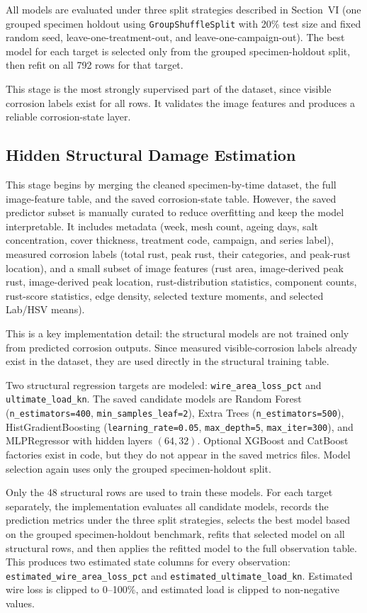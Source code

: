 \documentclass[conference]{IEEEtran}
\begin{document}
All models are evaluated under three split strategies described in Section~VI (one grouped specimen holdout using \texttt{GroupShuffleSplit} with 20\% test size and fixed random seed, leave-one-treatment-out, and leave-one-campaign-out). The best model for each target is selected only from the grouped specimen-holdout split, then refit on all 792 rows for that target.

This stage is the most strongly supervised part of the dataset, since visible corrosion labels exist for all rows. It validates the image features and produces a reliable corrosion-state layer.

\subsection{Hidden Structural Damage Estimation}
This stage begins by merging the cleaned specimen-by-time dataset, the full image-feature table, and the saved corrosion-state table. However, the saved predictor subset is manually curated to reduce overfitting and keep the model interpretable. It includes metadata (week, mesh count, ageing days, salt concentration, cover thickness, treatment code, campaign, and series label), measured corrosion labels (total rust, peak rust, their categories, and peak-rust location), and a small subset of image features (rust area, image-derived peak rust, image-derived peak location, rust-distribution statistics, component counts, rust-score statistics, edge density, selected texture moments, and selected Lab/HSV means).

This is a key implementation detail: the structural models are not trained only from predicted corrosion outputs. Since measured visible-corrosion labels already exist in the dataset, they are used directly in the structural training table.

Two structural regression targets are modeled: \texttt{wire\_area\_loss\_pct} and \texttt{ultimate\_load\_kn}. The saved candidate models are Random Forest (\texttt{n\_estimators=400}, \texttt{min\_samples\_leaf=2}), Extra Trees (\texttt{n\_estimators=500}), HistGradientBoosting (\texttt{learning\_rate=0.05}, \texttt{max\_depth=5}, \texttt{max\_iter=300}), and MLPRegressor with hidden layers $(64,32)$. Optional XGBoost and CatBoost factories exist in code, but they do not appear in the saved metrics files. Model selection again uses only the grouped specimen-holdout split.

Only the 48 structural rows are used to train these models. For each target separately, the implementation evaluates all candidate models, records the prediction metrics under the three split strategies, selects the best model based on the grouped specimen-holdout benchmark, refits that selected model on all structural rows, and then applies the refitted model to the full observation table. This produces two estimated state columns for every observation: \texttt{estimated\_wire\_area\_loss\_pct} and \texttt{estimated\_ultimate\_load\_kn}. Estimated wire loss is clipped to 0--100\%, and estimated load is clipped to non-negative values.
\end{document}

